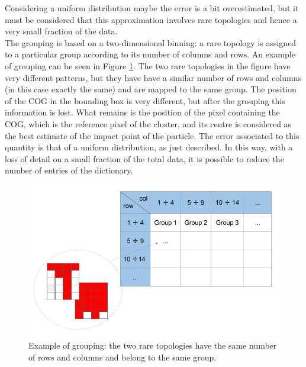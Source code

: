Considering a uniform distribution maybe the error is a bit overestimated, but it must be considered that this approximation involves rare topologies and hence a very small fraction of the data.\\
The grouping is based on a two-dimensional binning: a rare topology is assigned to a particular group according to its number of columns and rows. An example of grouping can be seen in Figure \ref{fig:gruppi}. The two rare topologies in the figure have very different patterns, but they have have a similar number of rows and columns (in this case exactly the same) and are mapped to the same group. The position of the COG in the bounding box is very different, but after the grouping this information is lost. What remains is the position of the pixel containing the COG, which is the reference pixel of the cluster, and its centre is considered as the best estimate of the impact point of the particle. The error associated to this quantity is that of a uniform distribution, as just described. In this way, with a loss of detail on a small fraction of the total data, it is possible to reduce the number of entries of the dictionary.
%
\begin{figure}
  \centering
  \includegraphics[scale=0.5]{figures/gruppi.png}
  \caption{Example of grouping: the two rare topologies have the same number of rows and columns and belong to the same group.}
  \label{fig:gruppi}
\end{figure}
%
